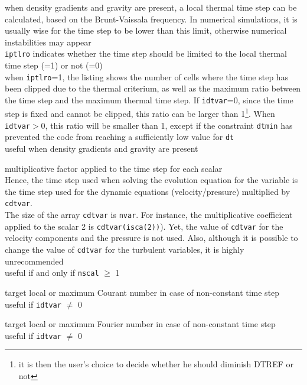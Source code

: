 {when density gradients and gravity are present, a local thermal time
step can be calculated, based on the Brunt-Vaissala frequency. In numerical
simulations, it is usually wise for the time step to be lower than this limit,
otherwise numerical instabilities may appear\\
{\tt iptlro} indicates whether the time step should be limited to the local thermal
time step (=1) or not (=0)\\
when {\tt iptlro}=1, the listing shows the number of cells where the time step has
been clipped due to the thermal criterium, as well as the maximum ratio between
the time step and the maximum thermal time step. If {\tt idtvar}=0, since the time
step is fixed and cannot be clipped, this ratio can be larger than
1\footnote{it is then the user's
choice to decide whether he should diminish DTREF or not}. When {\tt idtvar}$>$0, this
ratio will be smaller than 1, except if the constraint {\tt dtmin} has prevented the
code from reaching a sufficiently low value for {\tt dt}\\
useful when density gradients and gravity are present}

{multiplicative factor applied to the time step for each scalar\\
Hence, the time step used when solving the evolution equation for the
variable is the time step used for the dynamic equations (velocity/pressure)
multiplied by {\tt cdtvar}.\\
The size of the array {\tt cdtvar} is {\tt nvar}. For instance, the multiplicative
coefficient applied to the scalar 2 is {\tt cdtvar(isca(2))}). Yet, the value of
{\tt cdtvar} for the velocity components and the pressure is not used. Also,
although it is possible to change the value of {\tt cdtvar} for the turbulent
variables, it is highly unrecommended\\
useful if and only if {\tt nscal} $\geqslant$ 1}


{target local or maximum Courant number in case of non-constant time step\\
useful if {\tt idtvar} $\ne$ 0}

{target local or maximum Fourier number in case of non-constant time step\\
useful if {\tt idtvar} $\ne$ 0}

